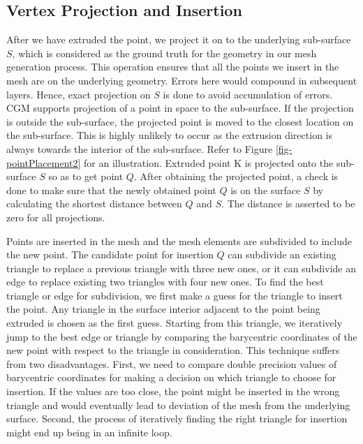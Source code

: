 \subsection{Vertex Projection and Insertion}

After we have extruded the point, we project it on to the underlying sub-surface $S$, which is considered as the ground truth for the geometry in our mesh generation process. This operation ensures that all the  points we insert in the mesh are on the underlying geometry. Errors here would compound in subsequent layers. Hence, exact projection on $S$ is done to avoid accumulation of errors. CGM supports projection of a point in space to the sub-surface. If the projection is outside the sub-surface, the projected point is moved to the closest location on the sub-surface. This is highly unlikely to occur as the extrusion direction is always towards the interior of the sub-surface. Refer to Figure \ref{fig-pointPlacement2} for an illustration. Extruded point K is projected onto the sub-surface $S$ so as to get point $Q$. After obtaining the projected point, a check is done to make sure that the newly obtained point $Q$ is on the surface $S$ by calculating the shortest distance between $Q$ and $S$. The distance is asserted to be zero for all projections.

Points are inserted in the mesh and the mesh elements are subdivided to include the new point. The candidate point for insertion $Q$ can subdivide an existing triangle to replace a previous triangle with three new ones, or it can subdivide an edge to replace existing two triangles with four new ones. To find the best triangle or edge for subdivision, we first make a guess for the triangle to insert the point. Any triangle in the surface interior adjacent to the point being extruded is chosen as the first guess. Starting from this triangle, we iteratively jump to the best edge or triangle by comparing the barycentric coordinates of the new point with respect to the triangle in consideration. This technique suffers from two disadvantages. First, we need to compare double precision values of barycentric coordinates for making a decision on which triangle to choose for insertion. If the values are too close, the point might be inserted in the wrong triangle and would eventually lead to deviation of the mesh from the underlying surface. Second, the process of iteratively finding the right triangle for insertion might end up being in an infinite loop. 

